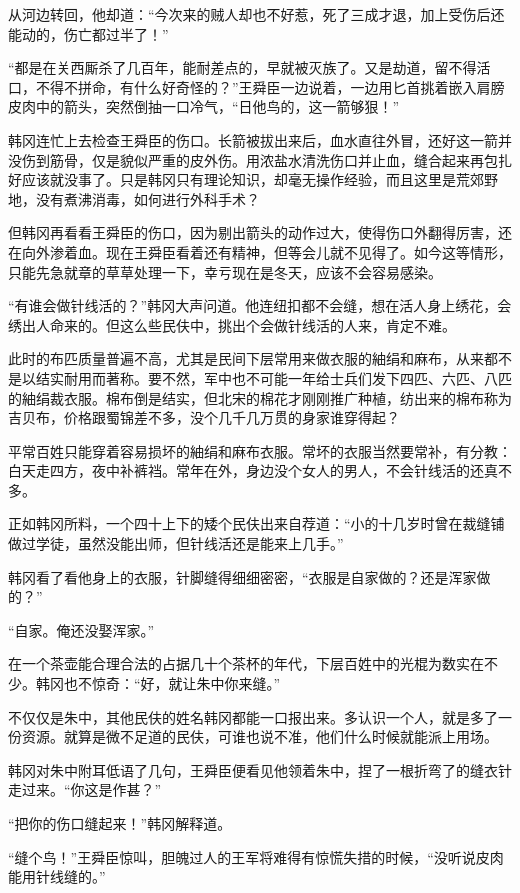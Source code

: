 从河边转回，他却道：“今次来的贼人却也不好惹，死了三成才退，加上受伤后还能动的，伤亡都过半了！”

“都是在关西厮杀了几百年，能耐差点的，早就被灭族了。又是劫道，留不得活口，不得不拼命，有什么好奇怪的？”王舜臣一边说着，一边用匕首挑着嵌入肩膀皮肉中的箭头，突然倒抽一口冷气，“日他鸟的，这一箭够狠！”

韩冈连忙上去检查王舜臣的伤口。长箭被拔出来后，血水直往外冒，还好这一箭并没伤到筋骨，仅是貌似严重的皮外伤。用浓盐水清洗伤口并止血，缝合起来再包扎好应该就没事了。只是韩冈只有理论知识，却毫无操作经验，而且这里是荒郊野地，没有煮沸消毒，如何进行外科手术？

但韩冈再看看王舜臣的伤口，因为剔出箭头的动作过大，使得伤口外翻得厉害，还在向外渗着血。现在王舜臣看着还有精神，但等会儿就不见得了。如今这等情形，只能先急就章的草草处理一下，幸亏现在是冬天，应该不会容易感染。

“有谁会做针线活的？”韩冈大声问道。他连纽扣都不会缝，想在活人身上绣花，会绣出人命来的。但这么些民伕中，挑出个会做针线活的人来，肯定不难。

此时的布匹质量普遍不高，尤其是民间下层常用来做衣服的紬绢和麻布，从来都不是以结实耐用而著称。要不然，军中也不可能一年给士兵们发下四匹、六匹、八匹的紬绢裁衣服。棉布倒是结实，但北宋的棉花才刚刚推广种植，纺出来的棉布称为吉贝布，价格跟蜀锦差不多，没个几千几万贯的身家谁穿得起？

平常百姓只能穿着容易损坏的紬绢和麻布衣服。常坏的衣服当然要常补，有分教：白天走四方，夜中补裤裆。常年在外，身边没个女人的男人，不会针线活的还真不多。

正如韩冈所料，一个四十上下的矮个民伕出来自荐道：“小的十几岁时曾在裁缝铺做过学徒，虽然没能出师，但针线活还是能来上几手。”

韩冈看了看他身上的衣服，针脚缝得细细密密，“衣服是自家做的？还是浑家做的？”

“自家。俺还没娶浑家。”

在一个茶壶能合理合法的占据几十个茶杯的年代，下层百姓中的光棍为数实在不少。韩冈也不惊奇：“好，就让朱中你来缝。”

不仅仅是朱中，其他民伕的姓名韩冈都能一口报出来。多认识一个人，就是多了一份资源。就算是微不足道的民伕，可谁也说不准，他们什么时候就能派上用场。

韩冈对朱中附耳低语了几句，王舜臣便看见他领着朱中，捏了一根折弯了的缝衣针走过来。“你这是作甚？”

“把你的伤口缝起来！”韩冈解释道。

“缝个鸟！”王舜臣惊叫，胆魄过人的王军将难得有惊慌失措的时候，“没听说皮肉能用针线缝的。”

